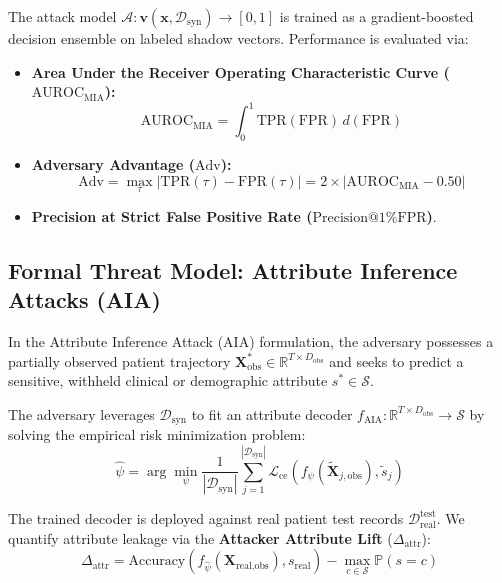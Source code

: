 \documentclass[journal]{IEEEtran}
\begin{document}
The attack model $\mathcal{A}: \mathbf{v}(\mathbf{x}, \mathcal{D}_{\text{syn}}) \to [0, 1]$ is trained as a gradient-boosted decision ensemble on labeled shadow vectors. Performance is evaluated via:
\begin{itemize}
    \item \textbf{Area Under the Receiver Operating Characteristic Curve ($\text{AUROC}_{\text{MIA}}$):}
    \begin{equation}
    \text{AUROC}_{\text{MIA}} = \int_0^1 \text{TPR}(\text{FPR}) \, d(\text{FPR})
    \end{equation}
    \item \textbf{Adversary Advantage ($\text{Adv}$):}
    \begin{equation}
    \text{Adv} = \max_{\tau} |\text{TPR}(\tau) - \text{FPR}(\tau)| = 2 \times |\text{AUROC}_{\text{MIA}} - 0.50|
    \end{equation}
    \item \textbf{Precision at Strict False Positive Rate ($\text{Precision@1\%FPR}$)}.
\end{itemize}

\subsection{Formal Threat Model: Attribute Inference Attacks (AIA)}
In the Attribute Inference Attack (AIA) formulation, the adversary possesses a partially observed patient trajectory $\mathbf{X}^*_{\text{obs}} \in \mathbb{R}^{T \times D_{\text{obs}}}$ and seeks to predict a sensitive, withheld clinical or demographic attribute $s^* \in \mathcal{S}$.

The adversary leverages $\mathcal{D}_{\text{syn}}$ to fit an attribute decoder $f_{\text{AIA}}: \mathbb{R}^{T \times D_{\text{obs}}} \to \mathcal{S}$ by solving the empirical risk minimization problem:
\begin{equation}
\hat{\psi} = \arg\min_\psi \frac{1}{|\mathcal{D}_{\text{syn}}|} \sum_{j=1}^{|\mathcal{D}_{\text{syn}}|} \mathcal{L}_{\text{ce}}\left(f_\psi(\tilde{\mathbf{X}}_{j, \text{obs}}), \tilde{s}_j\right)
\end{equation}

The trained decoder is deployed against real patient test records $\mathcal{D}_{\text{real}}^{\text{test}}$. We quantify attribute leakage via the \textbf{Attacker Attribute Lift} ($\Delta_{\text{attr}}$):
\begin{equation}
\Delta_{\text{attr}} = \text{Accuracy}\left(f_{\hat{\psi}}(\mathbf{X}_{\text{real}, \text{obs}}), s_{\text{real}}\right) - \max_{c \in \mathcal{S}} \mathbb{P}(s = c)
\end{equation}
\end{document}
